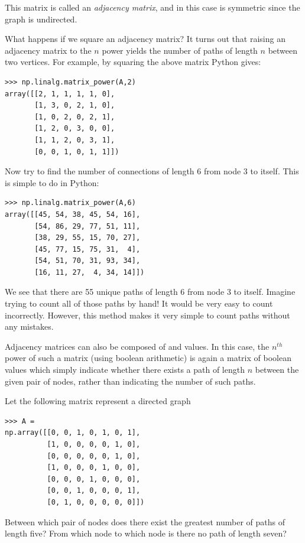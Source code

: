 This matrix is called an \emph{adjacency matrix}, and in this case is
symmetric since the graph is undirected.

What happens if we square an adjacency matrix?
It turns out that raising an adjacency matrix to the $n$ power yields the number of paths of length $n$ between two vertices.
For example, by squaring the above matrix Python gives:
\begin{lstlisting}
>>> np.linalg.matrix_power(A,2)
array([[2, 1, 1, 1, 1, 0],
       [1, 3, 0, 2, 1, 0],
       [1, 0, 2, 0, 2, 1],
       [1, 2, 0, 3, 0, 0],
       [1, 1, 2, 0, 3, 1],
       [0, 0, 1, 0, 1, 1]])
\end{lstlisting}

Now try to find the number of connections of length 6 from node 3 to itself.
This is simple to do in Python:
\begin{lstlisting}
>>> np.linalg.matrix_power(A,6)
array([[45, 54, 38, 45, 54, 16],
       [54, 86, 29, 77, 51, 11],
       [38, 29, 55, 15, 70, 27],
       [45, 77, 15, 75, 31,  4],
       [54, 51, 70, 31, 93, 34],
       [16, 11, 27,  4, 34, 14]])
\end{lstlisting}
We see that there are 55 unique paths of length 6 from node 3 to itself.
Imagine trying to count all of those paths by hand!
It would be very easy to count incorrectly.
However, this method makes it very simple to count paths without any mistakes.

Adjacency matrices can also be composed of  and  values.
In this case, the $n^{th}$ power of such a matrix (using boolean arithmetic)
is again a matrix of
boolean values which simply indicate whether there exists a path of length $n$ between the given pair of nodes, rather than indicating the number of such
paths.

\begin{problem}
Let the following matrix represent a directed graph
\begin{lstlisting}
>>> A =
np.array([[0, 0, 1, 0, 1, 0, 1],
          [1, 0, 0, 0, 0, 1, 0],
          [0, 0, 0, 0, 0, 1, 0],
          [1, 0, 0, 0, 1, 0, 0],
          [0, 0, 0, 1, 0, 0, 0],
          [0, 0, 1, 0, 0, 0, 1],
          [0, 1, 0, 0, 0, 0, 0]])
\end{lstlisting}

Between which pair of nodes does there exist the greatest number of paths
of length five?
From which node to which node is there no path of length seven?
\end{problem}

